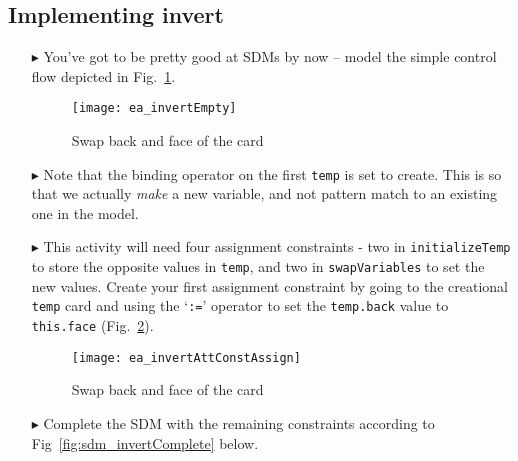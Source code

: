 \newpage
\hypertarget{invertCard vis}{}
\subsection{Implementing invert}
\visHeader

\begin{itemize}

\vspace{0.5cm}

\item[$\blacktriangleright$] You've got to be pretty good at SDMs by now -- model the simple control flow depicted in Fig.~\ref{fig:sdm_invertEmpty}. 

\vspace{0.5cm}

\begin{figure}[htbp]
\begin{center}
  \texttt{[image: ea\_invertEmpty]}
  \caption{Swap back and face of the card}  
  \label{fig:sdm_invertEmpty}
\end{center}
\end{figure}

\item[$\blacktriangleright$] Note that the binding operator on the first \texttt{temp} is set to create. This is so that we actually \emph{make} a new
variable, and not pattern match to an existing one in the model.

\item[$\blacktriangleright$] This activity will need four assignment constraints - two in \texttt{initializeTemp} to store the opposite values in
\texttt{temp}, and two in \texttt{swapVariables} to set the new values. Create your first assignment constraint by going to the creational \texttt{temp} card
and using the `\texttt{:=}' operator to set the \texttt{temp.back} value to \texttt{this.face} (Fig.~\ref{fig:sdm_invertAssignment}).

\begin{figure}[htbp]
\begin{center}
  \texttt{[image: ea\_invertAttConstAssign]}
  \caption{Swap back and face of the card}  
  \label{fig:sdm_invertAssignment}
\end{center}
\end{figure}

\clearpage

\vspace*{0.5cm}

\item[$\blacktriangleright$] Complete the SDM with the remaining constraints according to Fig~\ref{fig:sdm_invertComplete} below.


\end{itemize}
